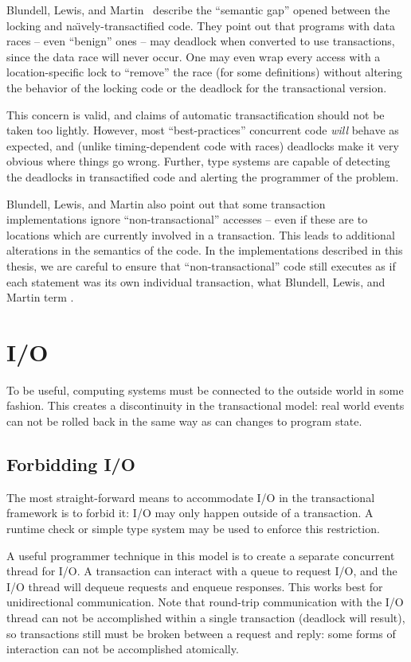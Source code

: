 Blundell, Lewis, and Martin~\cite{BlundellLeMa05} describe the
``semantic gap'' opened between the locking and
na{\"\i}vely-transactified code.  They point out that programs with
data races -- even ``benign'' ones -- may deadlock when converted to
use transactions, since the data race will never occur.  One may even
wrap every access with a location-specific lock to ``remove'' the race
(for some definitions) without altering the behavior of the locking
code or the deadlock for the transactional version.

This concern is valid, and claims of automatic transactification
should not be taken too lightly.  However, most ``best-practices''
concurrent code \emph{will} behave as expected, and (unlike
timing-dependent code with races) deadlocks make it very obvious where
things go wrong.  Further, type systems are capable of detecting the
deadlocks in transactified code and alerting
the programmer of the problem.

Blundell, Lewis, and Martin also point out that some transaction
implementations ignore ``non-transactional'' accesses -- even if these
are to locations which are currently involved in a transaction.  This
leads to additional alterations in the semantics of the code.  In the
implementations described in this thesis, we are careful to ensure
that ``non-transactional'' code still executes as if each statement
was its own individual transaction, what Blundell, Lewis, and Martin
term .

\section{I/O}
To be useful, computing systems must be connected to the outside world
in some fashion.  This creates a discontinuity in the transactional model:
real world events can not be rolled back in the same way as can changes
to program state.

\subsection{Forbidding I/O}
The most straight-forward means to accommodate I/O in the
transactional framework is to forbid it: I/O may only happen outside
of a transaction.  A runtime check or simple type system may be used
to enforce this restriction.

A useful programmer technique in this model is to create a separate concurrent
thread for I/O.  A transaction can interact with a queue to request
I/O, and the I/O thread will dequeue requests and enqueue responses.
This works best for unidirectional communication.  Note that
round-trip communication with the I/O thread can not be accomplished
within a single transaction (deadlock will result), so transactions
still must be broken between a request and reply: some forms of
interaction can not be accomplished atomically.

